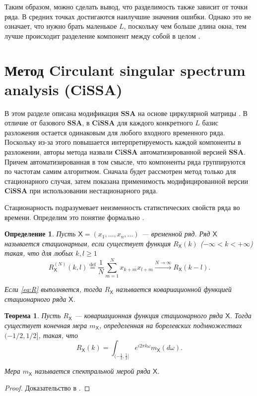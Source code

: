 \documentclass[a4paper, 11pt]{article}
\newcommand{\SSA}{\textbf{SSA}}
\newcommand{\CISSA}{\textbf{CiSSA}}
\newcommand{\TS}{\mathsf{X}}
\newtheorem{definition}{Определение} %
\newtheorem{theorem}{Теорема} %
\begin{document}
Таким образом, можно сделать вывод, что разделимость также зависит от точки ряда. В средних точках достигаются наилучшие значения ошибки. Однако это не означает, что нужно брать маленькое $L$, поскольку чем больше длина окна, тем лучше происходит разделение компонент между собой в целом \cite{golyandina2001analysis}.


\newpage






\section{Метод Circulant singular spectrum analysis (CiSSA)}
\label{sec:cissa}


В этом разделе описана модификация $\SSA$ на основе циркулярной матрицы \cite{bogalo2020}. В отличие от базового $\SSA$, в $\CISSA$ для каждого конкретного $L$ базис разложения остается одинаковым для любого входного временного ряда. Поскольку из-за этого повышается интерпретируемость каждой компоненты в разложении, авторы метода назвали $\CISSA$ автоматизированной версией $\SSA$. Причем автоматизированная в том смысле, что компоненты ряда группируются по частотам самим алгоритмом. Сначала будет рассмотрен метод только для стационарного случая, затем показана применимость модифицированной версии $\CISSA$ при использовании нестационарного ряда.

Стационарность подразумевает неизменность статистических свойств ряда во времени. Определим это понятие формально \cite{golyandina2001analysis}.  
\begin{definition}
		 Пусть $\TS = (x_1, \dots, x_n, \dots)$ — временной ряд. Ряд $\TS$ называется стационарным, если существует функция $R_{\TS}(k)$ ($-\infty < k < +\infty$) такая, что для любых $k, l \geq 1$  
		 \begin{equation}
			R_{\TS}^{(N)}(k, l) \overset{\mathrm{def}}{=} \frac{1}{N} \sum_{m=1}^{N} x_{k+m} x_{l+m} \xrightarrow{N \to \infty} R_{\TS}(k - l). \label{eq:R}	 	
		 \end{equation}
	
	Если \eqref{eq:R} выполняется, тогда $R_{\TS}$ называется ковариационной функцией стационарного ряда $\TS$.
\end{definition}

\begin{theorem}
	Пусть $R_{\TS}$ — ковариационная функция стационарного ряда $\TS$. Тогда существует конечная мера $m_{\TS}$, определенная на борелевских подмножествах $(-1/2, 1/2]$, такая, что  
	\[
	R_{\TS}(k) = \int_{(-\frac{1}{2}, \frac{1}{2}]} e^{i 2 \pi k \omega} m_{\TS}(d\omega).
	\]
	
	
	Мера $m_{\TS}$ называется спектральной мерой ряда $\TS$.
\end{theorem}
\begin{proof}
	Доказательство в \cite{golyandina2001analysis}.
\end{proof}
\end{document}
